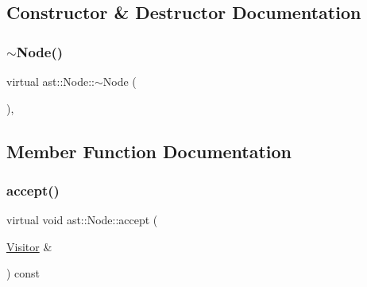 \subsection{Constructor \& Destructor Documentation}
\mbox{\label{structast_1_1_node_a178b5135f3dc18803c2e5997ce251738}} 
\subsubsection{\texorpdfstring{$\sim$\+Node()}{~Node()}}
{\footnotesize\ttfamily virtual ast\+::\+Node\+::$\sim$\+Node (\begin{DoxyParamCaption}{ }\end{DoxyParamCaption})\hspace{0.3cm}{\ttfamily [inline]}, {\ttfamily [virtual]}}



\subsection{Member Function Documentation}
\mbox{\label{structast_1_1_node_abc089ee6caaf06a4445ebdd8391fdebc}} 
\subsubsection{\texorpdfstring{accept()}{accept()}}
{\footnotesize\ttfamily virtual void ast\+::\+Node\+::accept (\begin{DoxyParamCaption}\item[{\hyperlink{structast_1_1_visitor}{Visitor} \&}]{ }\end{DoxyParamCaption}) const\hspace{0.3cm}{\ttfamily [pure virtual]}}



